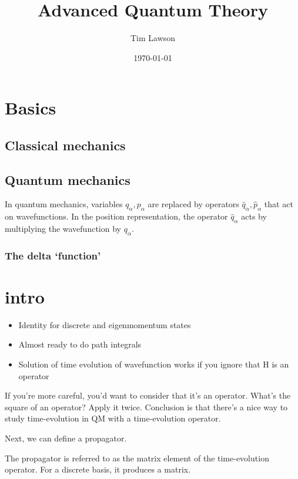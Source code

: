 \documentclass[a4paper]{extarticle}
\title{Advanced Quantum Theory}
\author{Tim Lawson}
\date{\today}
\begin{document}
\maketitle

\tableofcontents
\listoftheorems

\section{Basics}

\subsection{Classical mechanics}

\subsection{Quantum mechanics}

In quantum mechanics, variables $q_\alpha, p_\alpha$ are replaced by operators
$\hat{q}_\alpha, \hat{p}_\alpha$ that act on wavefunctions.
In the position representation, the operator $\hat{q}_\alpha$ acts by
multiplying the wavefunction by $q_\alpha$.

\subsubsection{The delta `function'}

\section{intro}

\begin{itemize}
  \item Identity for discrete and eigenmomentum states
  \item Almost ready to do path integrals
  \item Solution of time evolution of wavefunction works if you ignore that H is an operator
\end{itemize}

If you're more careful, you'd want to consider that it's an operator.
What's the square of an operator?
Apply it twice.
Conclusion is that there's a nice way to study time-evolution in QM with a
time-evolution operator.

Next, we can define a propagator.

The propagator is referred to as the matrix element of the time-evolution
operator.
For a discrete basis, it produces a matrix.
\end{document}
